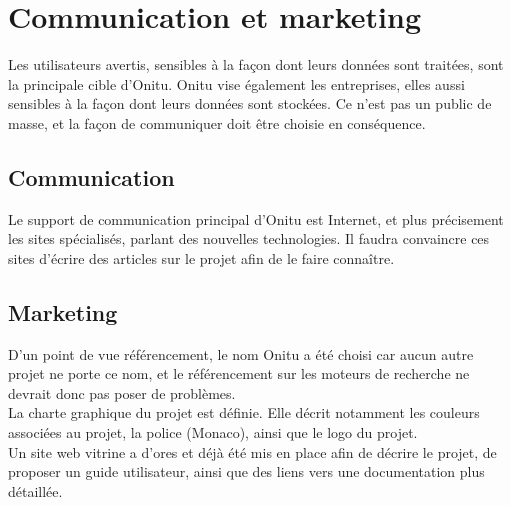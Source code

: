 \section{Communication et marketing}
Les utilisateurs avertis, sensibles à la façon dont leurs données sont traitées, sont la principale cible d'Onitu. Onitu vise également les entreprises, elles aussi sensibles à la façon dont leurs données sont stockées. Ce n'est pas un public de masse, et la façon de communiquer doit être choisie en conséquence.

\subsection{Communication}
Le support de communication principal d'Onitu est Internet, et plus précisement les sites spécialisés, parlant des nouvelles technologies. Il faudra convaincre ces sites d'écrire des articles sur le projet afin de le faire connaître.\\


\subsection{Marketing}
D'un point de vue référencement, le nom Onitu a été choisi car aucun autre projet ne porte ce nom, et le référencement sur les moteurs de recherche ne devrait donc pas poser de problèmes.\\

La charte graphique du projet est définie. Elle décrit notamment les couleurs associées au projet, la police (Monaco), ainsi que le logo du projet.\\

Un site web vitrine a d'ores et déjà été mis en place afin de décrire le projet, de proposer un guide utilisateur, ainsi que des liens vers une documentation plus détaillée.
